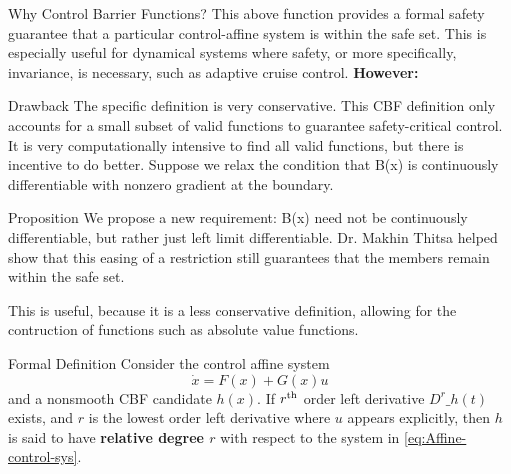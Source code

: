 \documentclass[aspectratio=169,xcolor=dvipsnames]{beamer}
\begin{document}
\begin{frame}{Why Control Barrier Functions?}
This above function provides a formal safety guarantee that a particular control-affine system is within the safe set. This is especially useful for dynamical systems where safety, or more specifically, invariance, is necessary, such as adaptive cruise control. 
\bigbreak
\textbf{However:}
\end{frame}


\begin{frame}{Drawback}
The specific definition is very conservative. 
This CBF definition only accounts for a small subset of valid functions to guarantee safety-critical control. It is very computationally intensive to find all valid functions, but there is incentive to do better. 
\bigbreak
Suppose we relax the condition that B(x) is continuously differentiable with nonzero gradient at the boundary. 
\end{frame}

\begin{frame}{Proposition}
We propose a new requirement: B(x) need not be continuously differentiable, but rather just left limit differentiable. 
\bigbreak
Dr. Makhin Thitsa helped show that this easing of a restriction still guarantees that the members remain within the safe set. 

This is useful, because it is a less conservative definition, allowing for the contruction of functions such as absolute value functions. 
\end{frame}

\begin{frame}{Formal Definition
}
Consider the control affine system 
\begin{equation}
\label{eq:Affine-control-sys}
\dot{x}=F(x)+G(x)u
\end{equation}
and a nonsmooth CBF candidate
$h(x)$. If $r\textsuperscript{th}$ order left derivative $D^r\_h(t)$ exists, and $r$ is the lowest order left derivative where $u$ appears explicitly, then $h$ is said to have {\bf relative degree $r$} with respect to the system in \ref{eq:Affine-control-sys}.
\end{frame}
\end{document}
